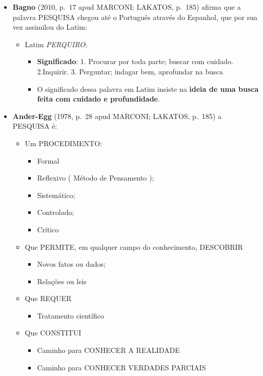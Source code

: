 \documentclass[
]{book}
\providecommand{\tightlist}{%
  \setlength{\itemsep}{0pt}\setlength{\parskip}{0pt}}
\begin{document}
\begin{itemize}
\tightlist
\item
  \textbf{Bagno} (2010, p.~17 apud MARCONI; LAKATOS, p.~185) afirma que a palavra PESQUISA chegou até o Português através do Espanhol, que por sua vez assimilou do Latim:

  \begin{itemize}
  \tightlist
  \item
    Latim \emph{PERQUIRO}:

    \begin{itemize}
    \tightlist
    \item
      \textbf{Significado}: 1. Procurar por toda parte; buscar com cuidado. 2.Inquirir. 3. Perguntar; indagar bem, aprofundar na busca
    \item
      O significado dessa palavra em Latim insiste na \textbf{ideia de uma busca feita com cuidado e profundidade}.
    \end{itemize}
  \end{itemize}
\item
  \textbf{Ander-Egg} (1978, p.~28 apud MARCONI; LAKATOS, p.~185) a PESQUISA é:

  \begin{itemize}
  \tightlist
  \item
    Um PROCEDIMENTO:

    \begin{itemize}
    \tightlist
    \item
      Formal
    \item
      Reflexivo ( Método de Pensamento );
    \item
      Sistemático;
    \item
      Controlado;
    \item
      Crítico
    \end{itemize}
  \item
    Que PERMITE, em qualquer campo do conhecimento, DESCOBRIR

    \begin{itemize}
    \tightlist
    \item
      Novos fatos ou dados;
    \item
      Relações ou leis
    \end{itemize}
  \item
    Que REQUER

    \begin{itemize}
    \tightlist
    \item
      Tratamento científico
    \end{itemize}
  \item
    Que CONSTITUI

    \begin{itemize}
    \tightlist
    \item
      Caminho para CONHECER A REALIDADE
    \item
      Caminho para CONHECER VERDADES PARCIAIS
    \end{itemize}
  \end{itemize}
\end{itemize}
\end{document}
